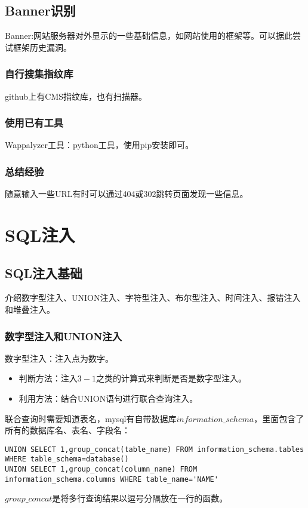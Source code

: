 \subsection{Banner识别}
Banner:网站服务器对外显示的一些基础信息，如网站使用的框架等。可以据此尝试框架历史漏洞。

\subsubsection*{自行搜集指纹库}
github上有CMS指纹库，也有扫描器。

\subsubsection*{使用已有工具}
Wappalyzer工具：python工具，使用pip安装即可。

\subsubsection*{总结经验}
随意输入一些URL有时可以通过404或302跳转页面发现一些信息。


\section{SQL注入}
\subsection{SQL注入基础}
介绍数字型注入、UNION注入、字符型注入、布尔型注入、时间注入、报错注入和堆叠注入。

\subsubsection*{数字型注入和UNION注入}
数字型注入：注入点为数字。
\begin{itemize}
    \item 判断方法：注入$3-1$之类的计算式来判断是否是数字型注入。
    \item 利用方法：结合UNION语句进行联合查询注入。
\end{itemize}
联合查询时需要知道表名，mysql有自带数据库$information\_schema$，里面包含了所有的数据库名、表名、字段名：
\begin{lstlisting}
UNION SELECT 1,group_concat(table_name) FROM information_schema.tables WHERE table_schema=database()
UNION SELECT 1,group_concat(column_name) FROM information_schema.columns WHERE table_name='NAME'
\end{lstlisting}
$ group\_concat $是将多行查询结果以逗号分隔放在一行的函数。

